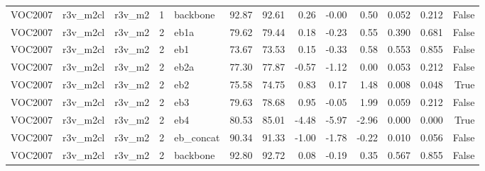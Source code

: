 \begin{table}
\begin{tabular}{lllrlrrrrrllr}
VOC2007 & r3v\_m2cl & r3v\_m2 & 1 & backbone & 92.87 & 92.61 & 0.26 & -0.00 & 0.50 & 0.052 & 0.212 & False \\
VOC2007 & r3v\_m2cl & r3v\_m2 & 2 & eb1a & 79.62 & 79.44 & 0.18 & -0.23 & 0.55 & 0.390 & 0.681 & False \\
VOC2007 & r3v\_m2cl & r3v\_m2 & 2 & eb1 & 73.67 & 73.53 & 0.15 & -0.33 & 0.58 & 0.553 & 0.855 & False \\
VOC2007 & r3v\_m2cl & r3v\_m2 & 2 & eb2a & 77.30 & 77.87 & -0.57 & -1.12 & 0.00 & 0.053 & 0.212 & False \\
VOC2007 & r3v\_m2cl & r3v\_m2 & 2 & eb2 & 75.58 & 74.75 & 0.83 & 0.17 & 1.48 & 0.008 & 0.048 & True \\
VOC2007 & r3v\_m2cl & r3v\_m2 & 2 & eb3 & 79.63 & 78.68 & 0.95 & -0.05 & 1.99 & 0.059 & 0.212 & False \\
VOC2007 & r3v\_m2cl & r3v\_m2 & 2 & eb4 & 80.53 & 85.01 & -4.48 & -5.97 & -2.96 & 0.000 & 0.000 & True \\
VOC2007 & r3v\_m2cl & r3v\_m2 & 2 & eb\_concat & 90.34 & 91.33 & -1.00 & -1.78 & -0.22 & 0.010 & 0.056 & False \\
VOC2007 & r3v\_m2cl & r3v\_m2 & 2 & backbone & 92.80 & 92.72 & 0.08 & -0.19 & 0.35 & 0.567 & 0.855 & False \\
\bottomrule
\end{tabular}
\end{table}
